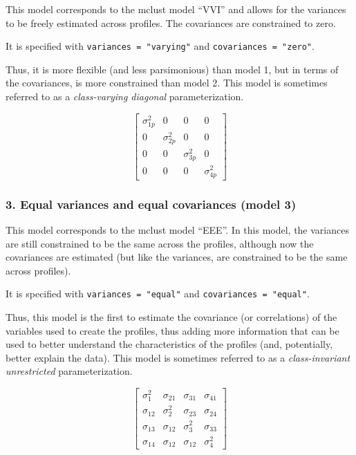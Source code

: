 \documentclass[english,man]{apa6}
\begin{document}
This model corresponds to the mclust model \enquote{VVI} and allows for the variances to be freely estimated across profiles. The covariances are constrained to zero.

It is specified with \texttt{variances\ =\ "varying"} and \texttt{covariances\ =\ "zero"}.

Thus, it is more flexible (and less parsimonious) than model 1, but in terms of the covariances, is more constrained than model 2. This model is sometimes referred to as a \emph{class-varying diagonal} parameterization.

\[ 
\left[ \begin{matrix} { \sigma  }_{ 1p }^{ 2 } & 0 & 0 & 0 \\ 0 & { \sigma  }_{ 2p }^{ 2 } & 0 & 0 \\ 0 & 0 & { \sigma  }_{ 3p }^{ 2 } & 0 \\ 0 & 0 & 0 & { \sigma  }_{ 4p }^{ 2 } \end{matrix} \right] 
\]

\hypertarget{equal-variances-and-equal-covariances-model-3}{%
\subsubsection{3. Equal variances and equal covariances (model 3)}\label{equal-variances-and-equal-covariances-model-3}}

This model corresponds to the mclust model \enquote{EEE}. In this model, the variances are still constrained to be the same across the profiles, although now the covariances are estimated (but like the variances, are constrained to be the same across profiles).

It is specified with \texttt{variances\ =\ "equal"} and \texttt{covariances\ =\ "equal"}.

Thus, this model is the first to estimate the covariance (or correlations) of the variables used to create the profiles, thus adding more information that can be used to better understand the characteristics of the profiles (and, potentially, better explain the data). This model is sometimes referred to as a \emph{class-invariant unrestricted} parameterization.

\[
\left[ \begin{matrix} { \sigma  }_{ 1 }^{ 2 } & { \sigma  }_{ 21 } & { \sigma  }_{ 31 } & { \sigma  }_{ 41 } \\ { \sigma  }_{ 12 } & { \sigma  }_{ 2 }^{ 2 } & { \sigma  }_{ 23 } & { \sigma  }_{ 24 } \\ { \sigma  }_{ 13 } & { \sigma  }_{ 12 } & { \sigma  }_{ 3 }^{ 2 } & { \sigma  }_{ 33 } \\ { \sigma  }_{ 14 } & { \sigma  }_{ 12 } & { \sigma  }_{ 12 } & { \sigma  }_{ 4 }^{ 2 } \end{matrix} \right] 
\]
\end{document}
